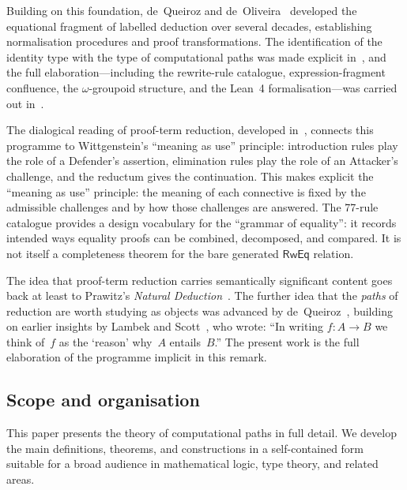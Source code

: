 \documentclass[manuscript]{BSLstyle}
\newcommand{\RwEq}{\mathsf{RwEq}}
\begin{document}
Building on this foundation, de~Queiroz and
de~Oliveira~\cite{deQueiroz94,deQueiroz2012,deOliveiraDeQueiroz99,deOliveiraDeQueiroz05}
developed the equational fragment of labelled deduction over several decades,
establishing normalisation procedures and proof transformations.
The identification of the identity type with the type of computational paths
was made explicit in~\cite{deQueirozDeOliveiraRamos2016,RamosDeQueirozDeOliveira2017},
and the full elaboration---including the rewrite-rule catalogue,
expression-fragment confluence, the $\omega$-groupoid structure, and the Lean~4
formalisation---was carried out
in~\cite{Ramos2019thesis,deVerasRamosDeQueirozDeOliveira2023,RamosDeVerasDeQueirozDeOliveira2025omega,RamosDeOliveiraDeQueirozDeVeras2025lean}.

The dialogical reading of proof-term reduction, developed in~\cite{deQueiroz91:meaning,deQueiroz01:meaning,deQueiroz08:reduction},
connects this programme to Wittgenstein's ``meaning as use'' principle:
introduction rules play the role of a Defender's assertion, elimination
rules play the role of an Attacker's challenge, and the reductum gives
the continuation.  This makes explicit the ``meaning as use'' principle:
the meaning of each connective is fixed by the admissible challenges
and by how those challenges are answered.  The 77-rule catalogue provides a
design vocabulary for the ``grammar of equality'': it records intended ways
equality proofs can be combined, decomposed, and compared.  It is not itself a
completeness theorem for the bare generated \(\RwEq\) relation.

\begin{remark}
The idea that proof-term reduction carries semantically significant
content goes back at least to Prawitz's \emph{Natural
Deduction}~\cite{Prawitz65}.  The further idea that the \emph{paths}
of reduction are worth studying as objects was advanced by
de~Queiroz~\cite{deQueiroz89,deQueiroz90:phd}, building on earlier insights
by Lambek and Scott~\cite{LambekScott86}, who wrote: ``In writing
$f : A \to B$ we think of~$f$ as the `reason' why~$A$ entails~$B$.''
The present work is the full elaboration of the programme implicit in
this remark.
\end{remark}

\subsection{Scope and organisation}

This paper presents the theory of computational
paths in full detail.  We develop the main
definitions, theorems, and constructions in a self-contained form suitable
for a broad audience in mathematical logic, type theory, and related areas.
\end{document}
